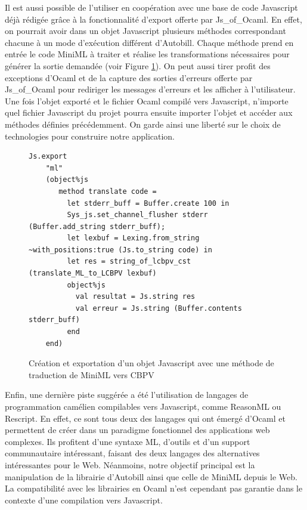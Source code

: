 \documentclass[12pt]{article}
\begin{document}
Il est aussi possible de l'utiliser en coopération avec une base de code Javascript déjà rédigée grâce à la fonctionnalité d'export offerte par Js\_of\_Ocaml. En effet, on pourrait avoir dans un objet Javascript plusieurs méthodes correspondant chacune à un mode d'exécution différent d'Autobill. Chaque méthode prend en entrée le code MiniML à traiter et réalise les transformations nécessaires pour générer la sortie demandée (voir Figure \ref{fig4}). On peut aussi tirer profit des exceptions d'Ocaml et de la capture des sorties d'erreurs offerte par Js\_of\_Ocaml pour rediriger les messages d'erreurs et les afficher à l'utilisateur. Une fois l'objet exporté et le fichier Ocaml compilé vers Javascript, n'importe quel fichier Javascript du projet pourra ensuite importer l'objet et accéder aux méthodes définies précédemment. On garde ainsi une liberté sur le choix de technologies pour construire notre application.\\

\begin{figure}[!b]
      \begin{lstlisting}[language=caml]
Js.export
    "ml"
    (object%js
       method translate code =
         let stderr_buff = Buffer.create 100 in
         Sys_js.set_channel_flusher stderr (Buffer.add_string stderr_buff);
         let lexbuf = Lexing.from_string ~with_positions:true (Js.to_string code) in
         let res = string_of_lcbpv_cst (translate_ML_to_LCBPV lexbuf)
         object%js
           val resultat = Js.string res
           val erreur = Js.string (Buffer.contents stderr_buff)
         end
    end)
\end{lstlisting}
      \caption{Création et exportation d'un objet Javascript avec une méthode de traduction de MiniML vers CBPV \label{fig4}}
\end{figure}
Enfin, une dernière piste suggérée a été l'utilisation de langages de programmation camélien compilables vers Javascript, comme ReasonML\cite{reasonml} ou Rescript\cite{rescript}. En effet, ce sont tous deux des langages qui ont émergé d'Ocaml et permettent de créer dans un paradigme fonctionnel des applications web complexes. Ils profitent d'une syntaxe ML, d'outils et d'un support communautaire intéressant, faisant des deux langages des alternatives intéressantes pour le Web. Néanmoins, notre objectif principal est la manipulation de la librairie d'Autobill ainsi que celle de MiniML depuis le Web. La compatibilité avec les librairies en Ocaml n'est cependant pas garantie dans le contexte d'une compilation vers Javascript. \\
\end{document}
